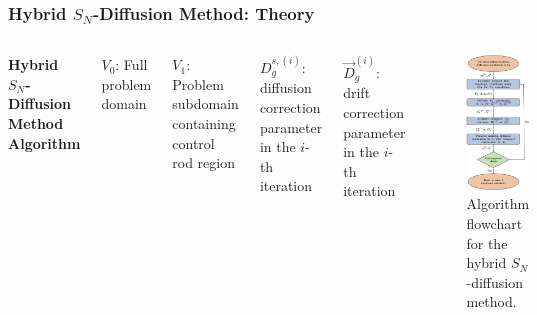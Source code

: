 \begin{frame}
  \frametitle{Hybrid $S_N$-Diffusion Method: Theory}
  \begin{columns}
    \textbf{Hybrid $S_N$-Diffusion Method Algorithm}
    \vspace{.5cm}

  {\small
  $V_0$: Full problem domain
  \vspace{.1cm}

  $V_1$: Problem subdomain containing control rod region
  \vspace{.1cm}

  $D^{s,(i)}_g$: diffusion correction parameter in the $i$-th iteration
  \vspace{.1cm}

  $\vec{D}^{(i)}_g$: drift correction parameter in the $i$-th iteration
\vspace{4cm}}
  \begin{figure}
    \centering
    \includegraphics[width=.45\textwidth]{images/algorithm}
    \begin{minipage}[b]{.49\textwidth}
      \caption{Algorithm flowchart for the hybrid $S_N$-diffusion method.}
    \end{minipage}
  \end{figure}
\end{columns}
\end{frame}

